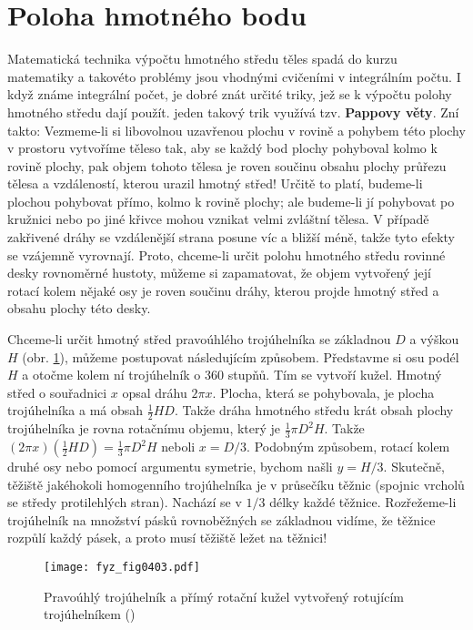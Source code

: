   \section{Poloha hmotného bodu}\label{fyz:IchapXIXsecII}
    Matematická technika výpočtu hmotného středu těles spadá do kurzu matematiky a takovéto problémy
    jsou vhodnými cvičeními v integrálním počtu. I když známe integrální počet, je dobré znát určité
    triky, jež se k výpočtu polohy hmotného středu dají použít. jeden takový trik využívá tzv.
    \textbf{Pappovy věty}. Zní takto: Vezmeme-li si libovolnou uzavřenou plochu v rovině a pohybem
    této plochy v prostoru vytvoříme těleso tak, aby se každý bod plochy pohyboval kolmo k rovině
    plochy, pak objem tohoto tělesa je roven součinu obsahu plochy průřezu tělesa a vzdáleností,
    kterou urazil hmotný střed! Určitě to platí, budeme-li plochou pohybovat přímo, kolmo k rovině
    plochy; ale budeme-li jí pohybovat po kružnici nebo po jiné křivce mohou vznikat velmi zvláštní
    tělesa. V případě zakřivené dráhy se vzdálenější strana posune víc a bližší méně, takže tyto
    efekty se vzájemně vyrovnají. Proto, chceme-li určit polohu hmotného středu rovinné desky
    rovnoměrné hustoty, můžeme si zapamatovat, že objem vytvořený její rotací kolem nějaké osy je
    roven součinu dráhy, kterou projde hmotný střed a obsahu plochy této desky.

    Chceme-li určit hmotný střed pravoúhlého trojúhelníka se základnou \(D\) a výškou \(H\) (obr.
    \ref{fyz:fig0403}), můžeme postupovat následujícím způsobem. Představme si osu podél \(H\) a
    otočme kolem ní trojúhelník o \num{360} stupňů. Tím se vytvoří kužel. Hmotný střed o souřadnici
    \(x\) opsal dráhu \(2\pi x\). Plocha, která se pohybovala, je plocha trojúhelníka a má obsah
    \(\frac{1}{2}HD\). Takže dráha hmotného středu krát obsah plochy trojúhelníka je rovna rotačnímu
    objemu, který je \(\frac{1}{3}\pi D^2H\). Takže \((2\pi x) (\frac{1}{2}HD) =\frac{1}{3}\pi
    D^2H\) neboli \(x=D/3\). Podobným způsobem, rotací kolem druhé osy nebo pomocí argumentu
    symetrie, bychom našli \(y=H/3\). Skutečně, těžiště jakéhokoli homogenního trojúhelníka je v
    průsečíku těžnic (spojnic vrcholů se středy protilehlých stran). Nachází se v \(1/3\) délky
    každé těžnice. Rozřežeme-li trojúhelník na množství pásků rovnoběžných se základnou vidíme, že
    těžnice rozpůlí každý pásek, a proto musí těžiště ležet na těžnici!  

    \begin{figure}[ht!] %
      \centering
      \texttt{[image: fyz\_fig0403.pdf]}
      \caption{Pravoúhlý trojúhelník a přímý rotační kužel vytvořený rotujícím trojúhelníkem 
              (\cite[s.~263]{Feynman01})}
      \label{fyz:fig0403}
    \end{figure}

